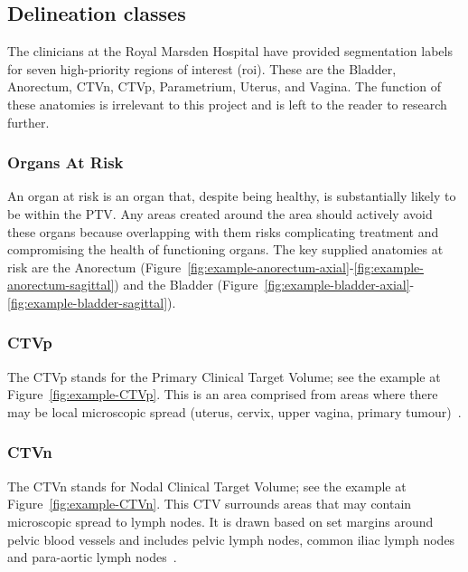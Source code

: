 \documentclass[12pt,twoside]{report}
\begin{document}

\subsection{Delineation classes}

The clinicians at the Royal Marsden Hospital have provided segmentation labels for seven high-priority regions of interest (roi). These are the Bladder, Anorectum, CTVn, CTVp, Parametrium, Uterus, and Vagina. The function of these anatomies is irrelevant to this project and is left to the reader to research further.



\subsubsection{Organs At Risk}\label{sec:data-organs-at-risk}

An organ at risk is an organ that, despite being healthy, is substantially likely to be within the PTV. Any areas created around the area should actively avoid these organs because overlapping with them risks complicating treatment and compromising the health of functioning organs. The key supplied anatomies at risk are the  Anorectum (Figure~\ref{fig:example-anorectum-axial}-\ref{fig:example-anorectum-sagittal}) and the Bladder (Figure~\ref{fig:example-bladder-axial}-\ref{fig:example-bladder-sagittal}).

\subsubsection{CTVp}\label{sec:data-CTVp}

The CTVp stands for the Primary Clinical Target Volume; see the example at Figure~\ref{fig:example-CTVp}. This is an area comprised from areas where there may be local microscopic spread (uterus, cervix, upper vagina, primary tumour)~\cite{AMLART-data}.

\subsubsection{CTVn}\label{sec:data-CTVn}

The CTVn stands for Nodal Clinical Target Volume; see the example at Figure~\ref{fig:example-CTVn}. This CTV surrounds areas that may contain microscopic spread to lymph nodes. It is drawn based on set margins around pelvic blood vessels and includes pelvic lymph nodes, common iliac lymph nodes and para-aortic lymph nodes~\cite{AMLART-data}.
\end{document}
